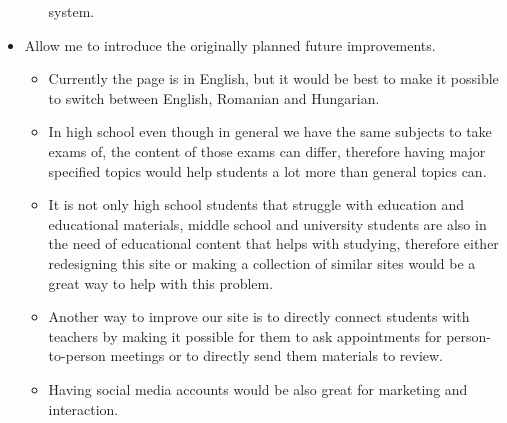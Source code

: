 \documentclass[12pt,a4paper]{article}
\begin{document}
\begin{spacing}{1.5}
\begin{itemize}
\begin{itemize}
                        system.
              \end{itemize}
        \item Allow me to introduce the originally planned future improvements.
              \begin{itemize}
                  \item Currently the page is in English, but it would be best to make it possible to
                        switch between English, Romanian and Hungarian.
                  \item In high school even though in general we have the same subjects to take exams
                        of, the content of those exams can differ, therefore having major specified
                        topics would help students a lot more than general topics can.
                  \item It is not only high school students that struggle with education and
                        educational materials, middle school and university students are also in the
                        need of educational content that helps with studying, therefore either
                        redesigning this site or making a collection of similar sites would be a great
                        way to help with this problem.
                  \item Another way to improve our site is to directly connect students with teachers
                        by making it possible for them to ask appointments for person-to-person
                        meetings or to directly send them materials to review.
                  \item Having social media accounts would be also great for marketing and interaction.
              \end{itemize}
    \end{itemize}


\end{spacing}
\end{document}
